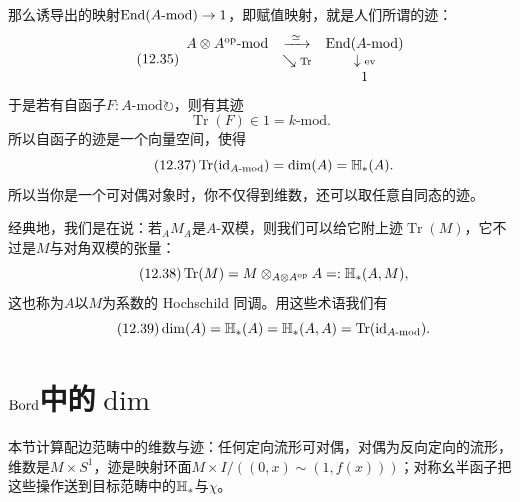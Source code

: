 那么诱导出的映射$\mathrm{End}(A\text{-}\mathrm{mod})\to 1$，即赋值映射，就是人们所谓的迹：
\begin{equation}\tag{12.35}
\begin{array}{ccc}
A\otimes A^{\mathrm{op}}\text{-}\mathrm{mod} & \xrightarrow{\ \simeq\ } & \End(A\text{-}\mathrm{mod})\\
 & \searrow{\scriptstyle \operatorname{Tr}} & \downarrow{\scriptstyle \mathrm{ev}}\\
 & & 1
\end{array}
\end{equation}
于是若有自函子$F\colon A\text{-}\mathrm{mod}\circlearrowright$，则有其迹
\begin{equation}\tag{12.36}
\operatorname{Tr}(F)\in 1=k\text{-}\mathrm{mod}.
\end{equation}
所以自函子的迹是一个向量空间，使得
\begin{equation}\tag{12.37}
\operatorname{Tr}(\mathrm{id}_{A\text{-}\mathrm{mod}})=\dim(A)=\mathbb{H}_{*}(A).
\end{equation}
所以当你是一个可对偶对象时，你不仅得到维数，还可以取任意自同态的迹。

经典地，我们是在说：若${}_AM_A$是$A$-双模，则我们可以给它附上迹$\operatorname{Tr}(M)$，它不过是$M$与对角双模的张量：
\begin{equation}\tag{12.38}
\operatorname{Tr}(M)=M\otimes_{A\otimes A^{\mathrm{op}}}A=:\mathbb{H}_{*}(A,M),
\end{equation}
这也称为$A$以$M$为系数的 Hochschild 同调。用这些术语我们有
\begin{equation}\tag{12.39}
\dim(A)=\mathbb{H}_{*}(A)=\mathbb{H}_{*}(A,A)=\operatorname{Tr}(\mathrm{id}_{A\text{-}\mathrm{mod}}).
\end{equation}


\section{$\mathrm{Bord}$中的$\dim$}\label{sec:12-5}

\begin{sectionkey}
本节计算配边范畴中的维数与迹：任何定向流形可对偶，对偶为反向定向的流形，维数是$M\times S^{1}$，迹是映射环面$M\times I/((0,x)\sim(1,f(x)))$；对称幺半函子把这些操作送到目标范畴中的$\mathbb{H}_*$与$\chi$。
\end{sectionkey}

